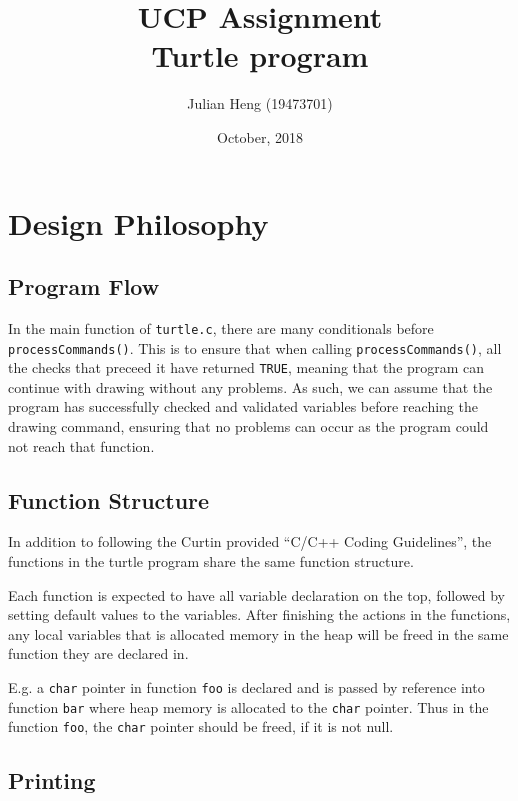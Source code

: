 \documentclass[a4paper, 12pt, titlepage]{article}
\title{\huge \textbf{UCP Assignment\\Turtle program}}
\author{Julian Heng (19473701)}
\date{October, 2018}
\newcommand{\code}[1]{\small\texttt{#1}\normalsize}
\begin{document}
\maketitle
\tableofcontents
\newpage

\pagestyle{fancy}

\fancyhf[FC]{\thepage}

\section{Design Philosophy}

\subsection{Program Flow}

In the main function of \code{turtle.c}, there are many conditionals
before \code{processCommands()}. This is to ensure that when calling
\code{processCommands()}, all the checks that preceed it have returned
\code{TRUE}, meaning that the program can continue with drawing without any
problems. As such, we can assume that the program has successfully checked
and validated variables before reaching the drawing command, ensuring
that no problems can occur as the program could not reach that function.

\subsection{Function Structure}

In addition to following the Curtin provided ``C/C++ Coding Guidelines'',
the functions in the turtle program share the same function structure.

Each function is expected to have all variable declaration on the top,
followed by setting default values to the variables. After finishing the
actions in the functions, any local variables that is allocated memory
in the heap will be freed in the same function they are declared in.

E.g. a \code{char} pointer in function \code{foo} is declared and is passed
by reference into function \code{bar} where heap memory is allocated to
the \code{char} pointer. Thus in the function \code{foo}, the \code{char}
pointer should be freed, if it is not null.

\subsection{Printing}
\end{document}
